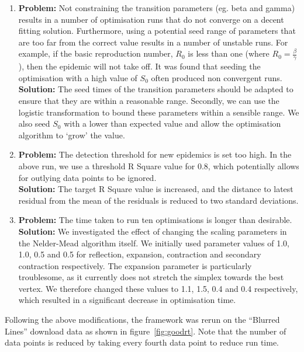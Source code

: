 \begin{enumerate}
\item \textbf{Problem:} Not constraining the transition parameters (eg. beta and gamma)
  results in a number of optimisation runs that do not converge on a
  decent fitting solution. Furthermore, using a potential seed range
  of parameters that are too far from the correct value results in a
  number of unstable runs. For example, if the basic reproduction
  number, $R_0$ is less than one (where $R_0 =\frac{\beta}{\gamma}$),
  then the epidemic will not take off. It was found that seeding the
  optimisation with a high value of $S_0$ often produced non
  convergent runs.\\
  \textbf{Solution:} The seed times of the transition parameters
  should be adapted to ensure that they are within a reasonable
  range. Secondly, we can use the logistic transformation to bound
  these parameters within a sensible range. We also seed $S_0$ with a
  lower than expected value and allow the optimisation algorithm to
  `grow' the value.
\item \textbf{Problem:} The detection threshold for new epidemics is set too high. In
  the above run, we use a threshold R Square value for 0.8, which
  potentially allows for outlying data points to be ignored.\\
  \textbf{Solution:} The target R Square value is increased, and the
  distance to latest residual from the mean of the residuals is
  reduced to two standard deviations.
\item \textbf{Problem:} The time taken to run ten optimisations is
  longer than desirable.\\
  \textbf{Solution:} We investigated the effect of changing the
  scaling parameters in the Nelder-Mead algorithm itself. We initially
  used parameter values of 1.0, 1.0, 0.5 and 0.5 for reflection,
  expansion, contraction and secondary contraction respectively. The
  expansion parameter is particularly troublesome, as it currently
  does not stretch the simplex towards the best vertex. We therefore
  changed these values to 1.1, 1.5, 0.4 and 0.4 respectively, which
  resulted in a significant decrease in optimisation time.
\end{enumerate}

Following the above modifications, the framework was rerun on the
``Blurred Lines'' download data as shown in
figure~\ref{fig:goodrt}. Note that the number of data points is
reduced by taking every fourth data point to reduce run time.

